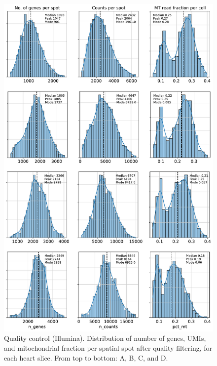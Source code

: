 \documentclass[utf8]{frontiers_suppmat} %
\begin{document}
\begin{figure}[htbp]
\begin{center}
\includegraphics[width=.75\textwidth]{figS2}%
\end{center}
\caption{Quality control (Illumina). Distribution of number of genes, UMIs, and mitochondrial fraction per spatial spot after quality filtering, for each heart slice. From top to bottom: A, B, C, and D.}\label{fig:S2}
\end{figure}
\end{document}
